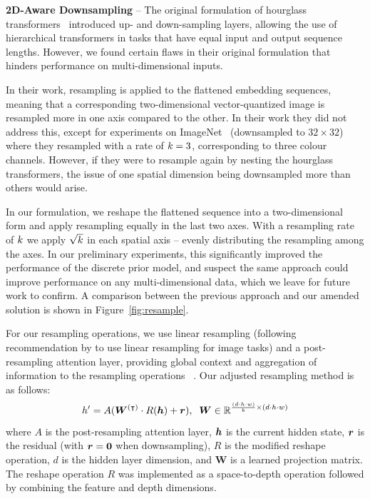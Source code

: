 \textbf{2D-Aware Downsampling} -- The original formulation of hourglass
transformers~\cite{nawrot2021hierarchical} introduced up- and down-sampling
layers, allowing the use of hierarchical transformers in tasks that have equal
input and output sequence lengths. However, we found certain flaws in their
original formulation that hinders performance on multi-dimensional inputs.

In their work, resampling is applied to the flattened embedding sequences,
meaning that a corresponding two-dimensional vector-quantized image is resampled
more in one axis compared to the other. In their work they did not address this,
except for experiments on ImageNet~\cite{russakovsky2015imagenet} (downsampled
to $32 \times 32$) where they resampled with a rate of $k=3$,
corresponding to three colour channels. However, if they were to resample again
by nesting the hourglass transformers, the issue of one spatial dimension being
downsampled more than others would arise.

In our formulation, we reshape the flattened sequence into a two-dimensional
form and apply resampling equally in the last two axes. With a resampling rate
of $k$ we apply $\sqrt{k}$ in each spatial axis -- evenly
distributing the resampling among the axes. In our preliminary experiments, this
significantly improved the performance of the discrete prior model, and suspect
the same approach could improve performance on any multi-dimensional data, which
we leave for future work to confirm. A comparison between the previous approach
and our amended solution is shown in Figure~\ref{fig:resample}.

For our resampling operations, we use linear resampling (following
recommendation by \citet{nawrot2021hierarchical} to use linear resampling for
image tasks) and a post-resampling attention layer, providing global context and
aggregation of information to the resampling operations ~\cite{nawrot2021hierarchical}. Our
adjusted resampling method is as follows:
\begin{equation}
    h' = A({\bm{W}}^{(\intercal)} \cdot R({\bm{h}}) + {\bm{r}}), \;\; {\bm{W}} \in
    \mathbb{R}^{\frac{(d \cdot h \cdot w)}{k} \times (d \cdot h \cdot w)}
\end{equation}
where $A$ is the post-resampling attention layer, ${\bm{h}}$ is the current hidden
state, ${\bm{r}}$ is the residual (with ${\bm{r}} = \bm{0}$ when downsampling), $R$ is the
modified reshape operation, $d$ is the hidden layer dimension, and $\textbf{W}$ is a
learned projection matrix. The reshape operation $R$ was implemented as a
space-to-depth operation followed by combining the feature and depth dimensions.

